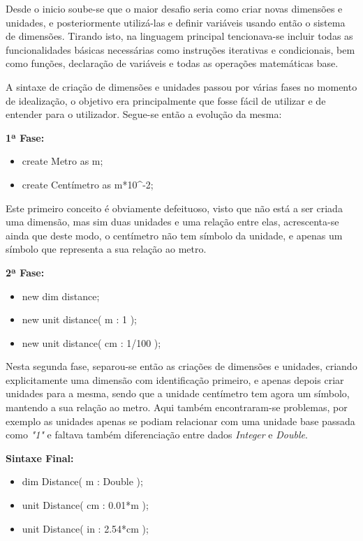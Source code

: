 \documentclass[10pt,portuguese]{article}
\begin{document}
\par Desde o inicio soube-se que o maior desafio seria como criar novas dimensões e unidades, e posteriormente utilizá-las e definir variáveis usando então o sistema de dimensões. Tirando isto, na linguagem principal tencionava-se incluir todas as funcionalidades básicas necessárias como instruções iterativas e condicionais, bem como funções, declaração de variáveis e todas as operações matemáticas base.
\par A sintaxe de criação de dimensões e unidades passou por várias fases no momento de idealização, o objetivo era principalmente que fosse fácil de utilizar e de entender para o utilizador. Segue-se então a evolução da mesma:
\newline
\par \textbf{1ª Fase:}
\begin{itemize}
    \item create Metro as m;
    \item create Centímetro as m*10\string^-2;
\end{itemize}
\par Este primeiro conceito é obviamente defeituoso, visto que não está a ser criada uma dimensão, mas sim duas unidades e uma relação entre elas, acrescenta-se ainda que deste modo, o centímetro não tem símbolo da unidade, e apenas um símbolo que representa a sua relação ao metro.
\newline
\par \textbf{2ª Fase:}
\begin{itemize}
    \item new dim distance;
    \item new unit distance( m : 1 );
    \item new unit distance( cm : 1/100 );
\end{itemize}
\par Nesta segunda fase, separou-se então as criações de dimensões e unidades, criando explicitamente uma dimensão com identificação primeiro, e apenas depois criar unidades para a mesma, sendo que a unidade centímetro tem agora um símbolo, mantendo a sua relação ao metro. Aqui também encontraram-se problemas, por exemplo as unidades apenas se podiam relacionar com uma unidade base passada como \emph{"1"} e faltava também diferenciação entre dados \emph{Integer} e \emph{Double}.
\newline
\par \textbf{Sintaxe Final:}
\begin{itemize}
    \item dim Distance( m : Double );
    \item unit Distance( cm : 0.01*m );
    \item unit Distance( in : 2.54*cm );
\end{itemize}
\end{document}
